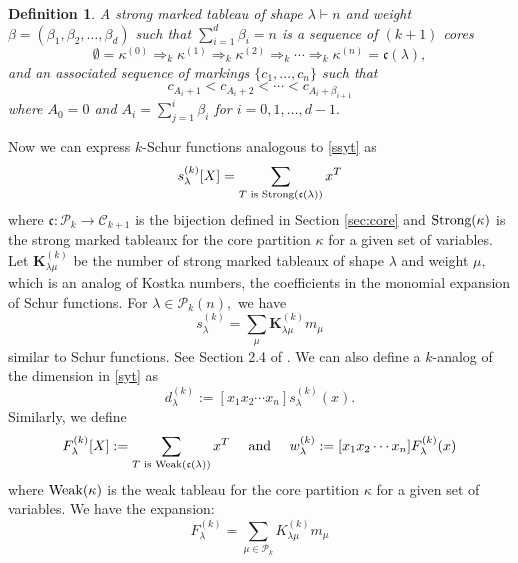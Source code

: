 \documentclass[11pt]{amsart}
\newtheorem{definition}[theorem]{Definition}
\newcommand{\cal}[1]{\mathcal{#1}}
\newcommand{\tn}[1]{\textnormal{#1}}
\begin{document}
\begin{definition} \label{def:tab}
A strong marked tableau of shape $\lambda \vdash n$ and weight $\beta=(\beta_1,\beta_2,\ldots,\beta_d)$ such that $\sum_{i=1}^d\beta_i=n$ is a sequence of $(k+1)$ cores
\begin{equation} \label{strchain}
\emptyset = \kappa^{(0)} \Rightarrow_k \kappa^{(1)} \Rightarrow_k \kappa^{(2)} \Rightarrow_k \cdots \Rightarrow_k \kappa^{(n)}=\mathfrak{c}(\lambda), 
\end{equation}
and an associated sequence of markings $\{c_1,\ldots,c_n\}$ such that
\begin{equation} \label{cond:cont}
   c_{A_i+1}  < c_{A_i+2} < \cdots <c_{A_i+ \beta_{i+1}}  
\end{equation}
where $A_0=0$ and $A_i=\sum_{j=1}^i \beta_i$ for $i=0,1,\ldots,d-1.$ 
\end{definition}
 Now we can express $k$-Schur functions analogous to \eqref{ssyt} as 
\[s_{\lambda}^{(k)}[X]=\sum_{T \tn{ is Strong}(\mathfrak{c}(\lambda))} x^T\]
where $\mathfrak{c}:\mathcal{P}_k \rightarrow \mathcal{C}_{k+1}$ is the bijection defined in Section \ref{sec:core} and $\textnormal{Strong}(\kappa)$ is the strong marked tableaux for the core partition $\kappa$ for a given set of variables. Let $\mathbf{K}_{\lambda \mu}^{(k)}$ be the number of strong marked tableaux of shape $\lambda$ and weight $\mu,$ which is an analog of Kostka numbers, the coefficients in the monomial expansion of Schur functions. For $\lambda \in \mathcal{P}_k(n),$ we have
\begin{equation} \label{strongkostka}
s_{\lambda}^{(k)}=\sum_{\mu }\mathbf{K}_{\lambda \mu}^{(k)} m_{\mu}
\end{equation}
similar to Schur functions. See Section 2.4 of \cite{LLMSSZ14}. We can also define a $k$-analog of the dimension in \eqref{syt} as
\begin{equation}\label{strongdim}
  d_{\lambda}^{(k)}:= [x_1 x_2 \cdots x_n] s_{\lambda}^{(k)}(x). 
\end{equation}
 Similarly, we define
 \begin{equation}\label{weakdim}
     F_{\lambda}^{(k)}[X]:=\sum_{T \tn{ is Weak}(\mathfrak{c}(\lambda))} x^T \quad \tn{ and } \quad w_{\lambda}^{(k)}:= [x_1 x_2 \cdots x_n] F_{\lambda}^{(k)}(x)
 \end{equation}
where $\textnormal{Weak}(\kappa)$ is the weak tableau for the core partition $\kappa$ for a given set of variables. We have the expansion:
\[F_{\lambda}^{(k)}=\sum_{\mu \in \cal{P}_k} K_{\lambda \mu}^{(k)} m_{\mu} \]
\end{document}
